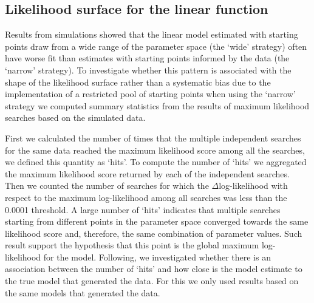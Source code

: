 
\subsection{Likelihood surface for the linear function}

Results from simulations showed that the linear model estimated with starting points draw from a wide range of the parameter space (the `wide' strategy) often have worse fit than estimates with starting points informed by the data (the `narrow' strategy). To investigate whether this pattern is associated with the shape of the likelihood surface rather than a systematic bias due to the implementation of a restricted pool of starting points when using the `narrow' strategy we computed summary statistics from the results of maximum likelihood searches based on the simulated data.

First we calculated the number of times that the multiple independent searches for the same data reached the maximum likelihood score among all the searches, we defined this quantity as `hits'. To compute the number of `hits' we aggregated the maximum likelihood score returned by each of the independent searches. Then we counted the number of searches for which the $\Delta$log-likelihood with respect to the maximum log-likelihood among all searches was less than the 0.0001 threshold. A large number of `hits' indicates that multiple searches starting from different points in the parameter space converged towards the same likelihood score and, therefore, the same combination of parameter values. Such result support the hypothesis that this point is the global maximum log-likelihood for the model. Following, we investigated whether there is an association between the number of `hits' and how close is the model estimate to the true model that generated the data. For this we only used results based on the same models that generated the data.

